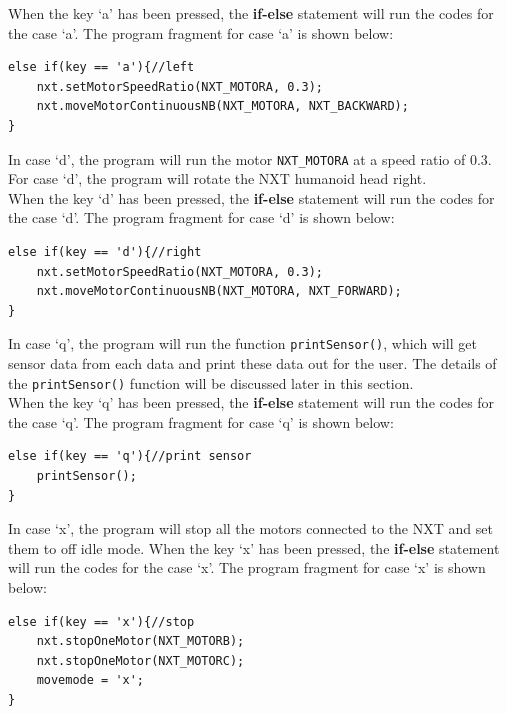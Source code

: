 \documentclass[11pt]{article}
\begin{document}
When the key `a' has been pressed, the {\bf if-else} statement will run 
the codes for the case `a'. The program fragment for case `a' is shown below:
\begin{lstlisting}
else if(key == 'a'){//left
    nxt.setMotorSpeedRatio(NXT_MOTORA, 0.3);
    nxt.moveMotorContinuousNB(NXT_MOTORA, NXT_BACKWARD);
}
\end{lstlisting}
In case `d', the program will run the motor {\tt NXT\_MOTORA} at a speed ratio 
of 0.3. For case `d', the program will rotate the NXT humanoid head right.\\

When the key `d' has been pressed, the {\bf if-else} statement will run 
the codes for the case `d'. The program fragment for case `d' is shown below:
\begin{lstlisting}
else if(key == 'd'){//right
    nxt.setMotorSpeedRatio(NXT_MOTORA, 0.3);
    nxt.moveMotorContinuousNB(NXT_MOTORA, NXT_FORWARD);
}
\end{lstlisting}
In case `q', the program will run the function {\tt printSensor()}, which will 
get sensor data from each data and print these data out for the user. The details 
of the {\tt printSensor()} function will be discussed later in this section.\\

When the key `q' has been pressed, the {\bf if-else} statement will run 
the codes for the case `q'. The program fragment for case `q' is shown below:
\begin{lstlisting}
else if(key == 'q'){//print sensor
    printSensor();
}
\end{lstlisting}
In case `x', the program will stop all the motors connected to the NXT and set 
them to off idle mode. When the key `x' has been pressed, the {\bf if-else} 
statement will run the codes for the case `x'. The program fragment for case `x' 
is shown below:
\begin{lstlisting}
else if(key == 'x'){//stop
    nxt.stopOneMotor(NXT_MOTORB);
    nxt.stopOneMotor(NXT_MOTORC);
    movemode = 'x';
}
\end{lstlisting}
\end{document}
